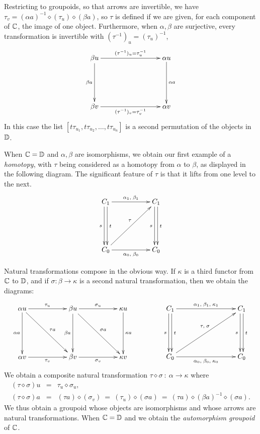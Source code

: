 \medskip
Restricting to groupoids, so that arrows are invertible, 
we have $\tau_v = (\alpha a)^{-1}\diamond(\tau_u)\diamond(\beta a)$, 
so $\tau$ is defined if we are given, for each component of $\mathbb{C}$, 
the image of one object. 
Furthermore, when $\alpha,\beta$ are surjective, 
every transformation is invertible with $(\tau^{-1})_u = (\tau_u)^{-1}$,  
$$
\xymatrix{ 
  \beta u  \ar[rrr]^{(\tau^{-1})_u = \tau_u^{-1}} \ar[dd]_{\beta a} 
    &&&  \alpha u \ar[dd]^{\alpha a} \\
    &&&  \\
  \beta v  \ar[rrr]_{(\tau^{-1})_v = \tau_v^{-1}}  
    &&&  \alpha v  \\
}
$$
In this case the list $[t\tau_{u_1},t\tau_{u_2},\ldots,t\tau_{u_n}]$ 
is a second permutation of the objects in $\mathbb{D}$. 

When $\mathbb{C}=\mathbb{D}$ and $\alpha,\beta$ are isomorphisms, 
we obtain our first example of a \emph{homotopy}, 
with $\tau$ being considered as a homotopy from $\alpha$ to $\beta$, 
as displayed in the following diagram. 
The significant feature of $\tau$ is that it lifts from one level to the next. 
$$
\xymatrix{ 
  C_1  \ar[rr]^{\alpha_1,\;\beta_1} \ar[dd]<-0.5ex>_s \ar[dd]<0.5ex>^t 
    &&  C_1   \ar[dd]<-0.5ex>_s \ar[dd]<0.5ex>^t \\
    &&  \\
  C_0  \ar[rr]_{\alpha_0,\;\beta_0} \ar[uurr]^(0.55){\tau}
    &&  C_0  \\
}
$$

\medskip
Natural transformations compose in the obvious way. 
If $\kappa$ is a third functor from $\mathbb{C}$ to $\mathbb{D}$, 
and if $\sigma : \beta \to \kappa$ is a second natural transformation, 
then we obtain the diagrams: 
$$
\xymatrix{ 
  \alpha u  \ar[rr]^{\tau_u} \ar[dd]_{\alpha a} \ar[rrdd]^{\tau a}
    &&  \beta u \ar[dd]_{\beta a} \ar[rr]^{\sigma_u} \ar[rrdd]^{\sigma a} 
        &&  \kappa u \ar[dd]^{\kappa a} \\
    &&  &&  \\
  \alpha v  \ar[rr]_{\tau_v} 
    &&  \beta v  \ar[rr]_{\sigma_v} 
        &&  \kappa v \\
}
\qquad\qquad
\xymatrix{ 
  C_1   \ar[rrr]^{\alpha_1,\;\beta_1,\;\kappa_1} 
        \ar[dd]<-0.5ex>_s \ar[dd]<0.5ex>^t 
    &&&  C_1   \ar[dd]<-0.5ex>_s \ar[dd]<0.5ex>^t \\
    &&&  \\
  C_0   \ar[rrr]_{\alpha_0,\;\beta_0,\;\kappa_0} 
        \ar[uurrr]^(0.55){\tau,\;\sigma}
    &&&  C_0  \\
}
$$ 
We obtain a composite natural transformation 
$\tau\diamond\sigma ~:~ \alpha \to \kappa$ where 
\begin{eqnarray*}
(\tau\diamond\sigma)u 
  &=&  \tau_u \diamond \sigma_u, \\ 
(\tau\diamond\sigma)a 
  &=&  (\tau a)\diamond(\sigma_v) 
       ~=~ (\tau_u)\diamond(\sigma a) 
       ~=~ (\tau a)\diamond(\beta a)^{-1}\diamond(\sigma a).
\end{eqnarray*}
We thus obtain a groupoid whose objects are isomorphisms and whose 
arrows are natural transformations. 
When $\mathbb{C}=\mathbb{D}$ and we obtain the \emph{automorphism groupoid} of $\mathbb{C}$. 

